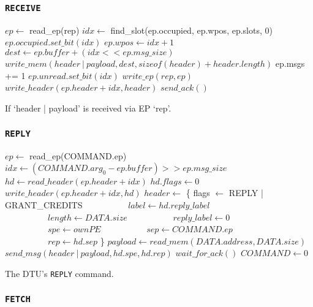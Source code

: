 \documentclass[a4paper,11pt,draft]{article}
\begin{document}
\subsubsection{\texttt{RECEIVE}}

\begin{algorithm}[H]
    $ep \gets$ read\_ep(rep)\;
    \BlankLine
    $idx \gets$ find\_slot(ep.occupied, ep.wpos, ep.slots, 0)\;
    $ep.occupied.set\_bit(idx)$\;
    $ep.wpos \gets idx + 1$\;
    \BlankLine
    $dest \gets ep.buffer + (idx << ep.msg\_size)$\;
    $write\_mem(header\ |\ payload, dest, sizeof(header) + header.length)$\;
    ep.msgs += 1\;
    $ep.unread.set\_bit(idx)$\;
    $write\_ep(rep, ep)$\;
    $write\_header(ep.header + idx, header)$\;
    \BlankLine
    $send\_ack()$\;
    \caption{If `header | payload' is received via EP `rep'.}
\end{algorithm}

\subsubsection{\texttt{REPLY}}

\begin{algorithm}[H]
    $ep \gets$ read\_ep(COMMAND.ep)\;
    \BlankLine
    $idx \gets (COMMAND.arg_0 - ep.buffer) >> ep.msg\_size$\;
    $hd \gets read\_header(ep.header + idx)$\;
    \BlankLine
    $hd.flags \gets 0$\;
    $write\_header(ep.header + idx, hd)$\;
    \BlankLine
    $header \gets$ \{ flags $\gets$ REPLY | GRANT\_CREDITS\;
    $\quad\quad\quad\quad\quad label \gets hd.reply\_label$\;
    $\quad\quad\quad\quad\quad length \gets DATA.size$\;
    $\quad\quad\quad\quad\quad reply\_label \gets 0$\;
    $\quad\quad\quad\quad\quad spe \gets ownPE$\;
    $\quad\quad\quad\quad\quad sep \gets COMMAND.ep$\;
    $\quad\quad\quad\quad\quad rep \gets hd.sep$ \}\;
    $payload \gets read\_mem(DATA.address, DATA.size)$\;
    $send\_msg(header\ |\ payload, hd.spe, hd.rep)$\;
    $wait\_for\_ack()$\;
    \BlankLine
    $COMMAND \gets 0$\;
    \caption{The DTU's \texttt{REPLY} command.}
\end{algorithm}

\subsubsection{\texttt{FETCH}}
\end{document}
